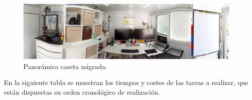 \begin{figure}[!htb]
\begin{center}
\includegraphics[width=1\textwidth]{./figuras/caseta_migrada}
\caption{Panorámica caseta migrada.}
\label{F:caseta_migrada}
\end{center}
\end{figure}
En la siguiente tabla se muestran los tiempos y costes de las tareas a realizar, que están dispuestas en orden cronológico de realización.
